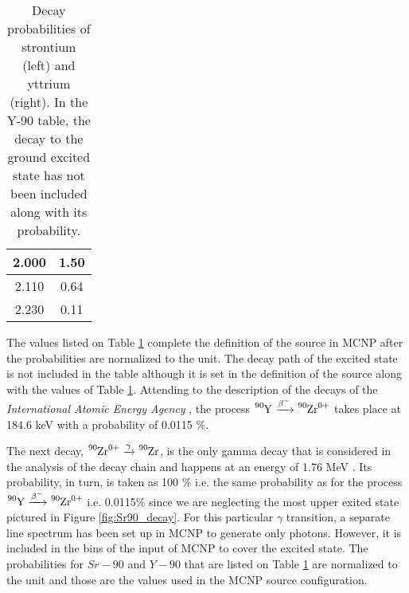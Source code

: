 \begin{table}[htbp]
\begin{minipage}[t]{0.48\textwidth}
\begin{tabular}{|c|c|}
      2.000                                                    & 1.50                                                                      \\ \hline
      2.110                                                    & 0.64                                                                      \\ \hline
      2.230                                                    & 0.11                                                                      \\ \hline
    \end{tabular}
    \label{tab:decay_probability of Y-90}
  \end{minipage}
  \caption{Decay probabilities of strontium (left) and yttrium (right). In the Y-90 table, the decay to the ground excited state has not been included along with its probability.}
  \label{tab:sampling of Sr-90 and Y-90}
\end{table}


The values listed on Table \ref{tab:sampling of Sr-90 and Y-90} complete the definition of the source in MCNP after the probabilities are normalized to the unit. The decay path of the excited state is not included in the table although it is set in the definition of the source along with the values of Table \ref{tab:sampling of Sr-90 and Y-90}. Attending to the description of the decays of the \emph{International Atomic Energy Agency} \cite{intlAtomicEnergy}, the process $\ce{^{90}{}Y} \xrightarrow{\beta ^-} \ce{^{90}{}Zr^0+ } $ takes place at 184.6 \unit{\kilo\electronvolt} with a probability of 0.0115 $\%$. 

The next decay, $\ce{^{90}{}Zr^0+ } \xrightarrow{\gamma} \ce{^{90}{}Zr }$, is the only gamma decay that is considered in the analysis of the decay chain and happens at an energy of 1.76 \unit{\mega\electronvolt} \cite{intlAtomicEnergy}. Its probability, in turn, is taken as 100 $\%$ i.e. the same probability as for the process $\ce{^{90}{}Y} \xrightarrow{\beta ^-} \ce{^{90}{}Zr^0+ } $ i.e. 0.0115$\%$ since we are neglecting the most upper exited state pictured in Figure \ref{fig:Sr90_decay}. For this particular $\gamma$ transition, a separate line spectrum has been set up in MCNP to generate only photons. However, it is included in the bins of the input of MCNP to cover the excited state. The probabilities for $Sr-90$ and $Y-90$ that are listed on Table \ref{tab:sampling of Sr-90 and Y-90} are normalized to the unit and those are the values used in the MCNP source configuration.
